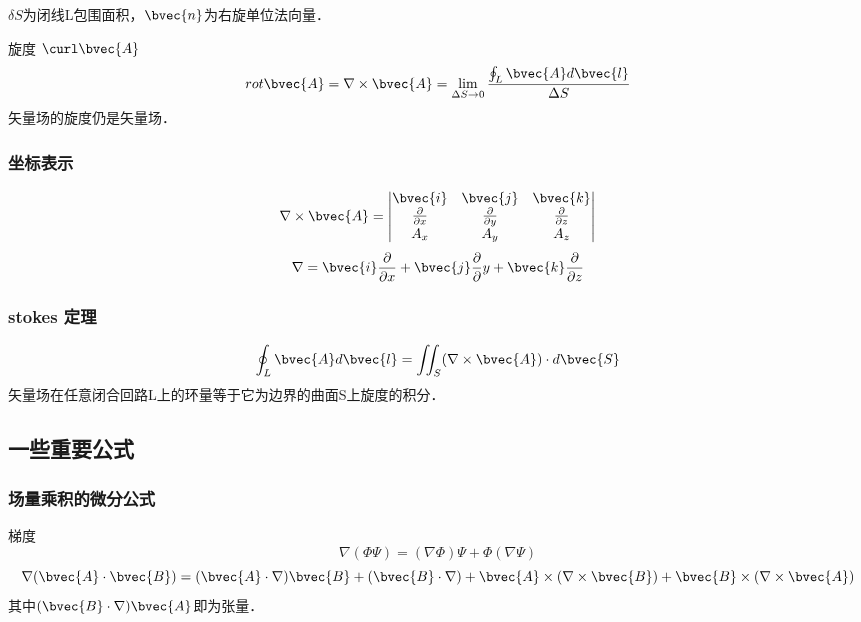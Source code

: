 $\delta S$为闭线L包围面积，$\bvec{n}$为右旋单位法向量．

旋度 $\curl\bvec{A}$
\begin{equation}\label{VecAnl_eq11}
rot \bvec{A}=\nabla \times \bvec{A}=\lim_{\Delta S \to 0} \frac{\oint_L \bvec{A} d\bvec{l}}{\Delta S}
\end{equation}
矢量场的旋度仍是矢量场．

\subsubsection{坐标表示}
\begin{equation}\label{VecAnl_eq12}
\nabla \times \bvec{A}=
\begin{vmatrix}
\bvec{i} & \bvec{j} & \bvec{k} \\
\frac{\partial}{\partial x} & \frac{\partial}{\partial y} & \frac{\partial}{\partial z}\\
A_x & A_y & A_z
\end{vmatrix}
\end{equation}
\begin{equation}\label{VecAnl_eq13}
\nabla = \bvec{i}\frac{\partial}{\partial x}+ \bvec{j} \frac{\partial}{\partial}y + \bvec{k} \frac{\partial}{\partial z}
\end{equation}

\subsubsection{stokes 定理}
\begin{equation}\label{VecAnl_eq14}
\oint_L \bvec{A} d\bvec{l}=\iint_S (\nabla \times \bvec{A})\cdot d\bvec{S}
\end{equation}
矢量场在任意闭合回路L上的环量等于它为边界的曲面S上旋度的积分．

\subsection{一些重要公式}
\subsubsection{场量乘积的微分公式}
梯度
\begin{equation}\label{VecAnl_eq15}
\nabla(\Phi \Psi)=(\nabla \Phi)\Psi+\Phi(\nabla \Psi)
\end{equation}
\begin{equation}\label{VecAnl_eq16}
\nabla(\bvec{A} \cdot \bvec{B})=(\bvec{A} \cdot \nabla)\bvec{B}+(\bvec{B}\cdot\nabla)+\bvec{A}\times(\nabla \times \bvec{B})+\bvec{B}\times(\nabla \times \bvec{A})
\end{equation}
其中$(\bvec{B}\cdot\nabla)\bvec{A}$即为张量．

